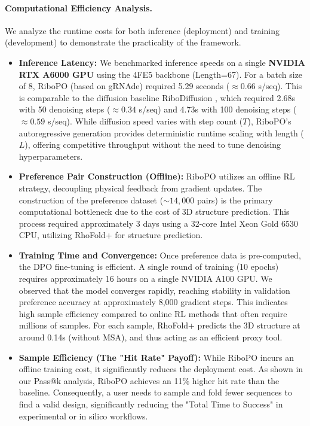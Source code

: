 {
\paragraph{Computational Efficiency Analysis.} 
We analyze the runtime costs for both inference (deployment) and training (development) to demonstrate the practicality of the framework.
\begin{itemize}
    \item \textbf{Inference Latency:} We benchmarked inference speeds on a single \textbf{NVIDIA RTX A6000 GPU} using the 4FE5 backbone (Length=67). For a batch size of 8, RiboPO (based on gRNAde) required 5.29 seconds ($\approx 0.66$ s/seq). This is comparable to the diffusion baseline RiboDiffusion \citep{huang2024ribodiffusion}, which required 2.68s with 50 denoising steps ($\approx 0.34$ s/seq) and 4.73s with 100 denoising steps ($\approx 0.59$ s/seq). While diffusion speed varies with step count ($T$), RiboPO's autoregressive generation provides deterministic runtime scaling with length ($L$), offering competitive throughput without the need to tune denoising hyperparameters.
    
    \item \textbf{Preference Pair Construction (Offline):} RiboPO utilizes an offline RL strategy, decoupling physical feedback from gradient updates. The construction of the preference dataset ($\sim 14,000$ pairs) is the primary computational bottleneck due to the cost of 3D structure prediction. This process required approximately 3 days using a 32-core Intel Xeon Gold 6530 CPU, utilizing RhoFold+ \citep{shen2024accurate} for structure prediction.
    
    \item \textbf{Training Time and Convergence:} Once preference data is pre-computed, the DPO fine-tuning is efficient. A single round of training (10 epochs) requires approximately 16 hours on a single NVIDIA A100 GPU. We observed that the model converges rapidly, reaching stability in validation preference accuracy at approximately 8,000 gradient steps. This indicates high sample efficiency compared to online RL methods that often require millions of samples. For each sample, RhoFold+ predicts the 3D structure at around 0.14s (without MSA), and thus acting as an efficient proxy tool. 

    \item \textbf{Sample Efficiency (The "Hit Rate" Payoff):} While RiboPO incurs an offline training cost, it significantly reduces the deployment cost. As shown in our Pass@k analysis, RiboPO achieves an 11\% higher hit rate than the baseline. Consequently, a user needs to sample and fold fewer sequences to find a valid design, significantly reducing the "Total Time to Success" in experimental or in silico workflows.
\end{itemize}

}
